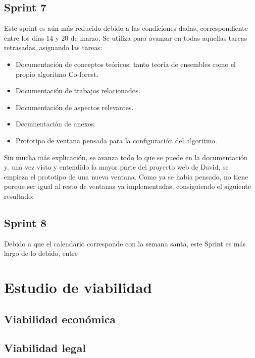 \subsection{Sprint 7}
Este sprint es aún más reducido debido a las condiciones dadas, correspondiente entre los días 14 y 20 de marzo. Se utiliza para avanzar en todas aquellas tareas retrasadas, asignando las tareas:
\begin{itemize}
	\item Documentación de conceptos teóricos: tanto teoría de ensembles como el propio algoritmo Co-forest.
	\item Documentación de trabajos relacionados.
	\item Documentación de aspectos relevantes.
	\item Dccumentación de anexos.
	\item Prototipo de ventana pensada para la configuración del algoritmo.
	
\end{itemize}
Sin mucha más explicación, se avanza todo lo que se puede en la documentación y, una vez visto y entendido la mayor parte del proyecto web de David, se empieza el prototipo de una nueva ventana. Como ya se habia pensado, no tiene porque ser igual al resto de ventanas ya implementadas, consiguiendo el siguiente resultado:

\subsection{Sprint 8}
Debido a que el calendario corresponde con la semana santa, este Sprint es más largo de lo debido, entre 

\section{Estudio de viabilidad}

\subsection{Viabilidad económica}

\subsection{Viabilidad legal}


